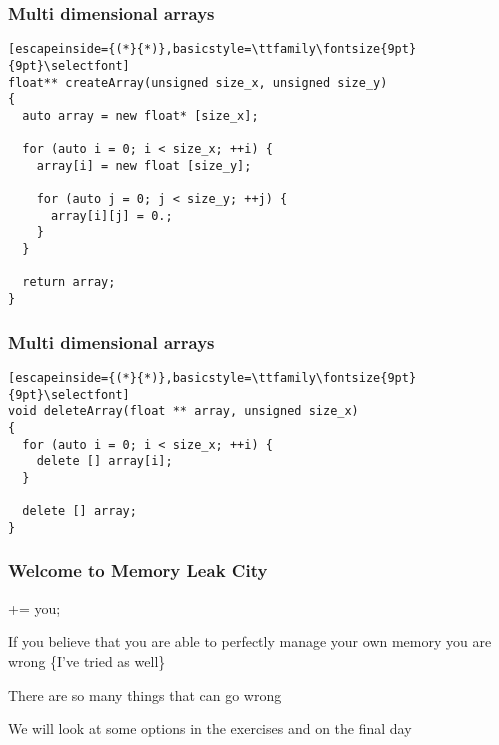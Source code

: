 \documentclass[14pt,a4paper,dvipsnames,usenames]{beamer}
\begin{document}
\begin{frame}[fragile]
  \frametitle{Multi dimensional arrays}

  \begin{lstlisting}[escapeinside={(*}{*)},basicstyle=\ttfamily\fontsize{9pt}{9pt}\selectfont]
float** createArray(unsigned size_x, unsigned size_y)
{
  auto array = new float* [size_x];

  for (auto i = 0; i < size_x; ++i) {
    array[i] = new float [size_y];

    for (auto j = 0; j < size_y; ++j) {
      array[i][j] = 0.;
    }
  }

  return array;
}
  \end{lstlisting}

\end{frame}

\begin{frame}[fragile]
  \frametitle{Multi dimensional arrays}

  \begin{lstlisting}[escapeinside={(*}{*)},basicstyle=\ttfamily\fontsize{9pt}{9pt}\selectfont]
void deleteArray(float ** array, unsigned size_x)
{
  for (auto i = 0; i < size_x; ++i) {
    delete [] array[i];
  }

  delete [] array;
}
  \end{lstlisting}

\end{frame}

\begin{frame}
  \frametitle{Welcome to Memory Leak City}

  { += {\color{Tropiteal}you};}

  \vspace{1em}

  If you believe that you are able to perfectly manage your own memory you are {\color{Marty}wrong}
  {\fontsize{8pt}{8pt}\selectfont \{I've tried as well\}}

  \vspace{1em}
  There are so many things that can go wrong

  \vspace{1em}
  We will look at some options in the exercises and on the final day
  
\end{frame}
\end{document}
